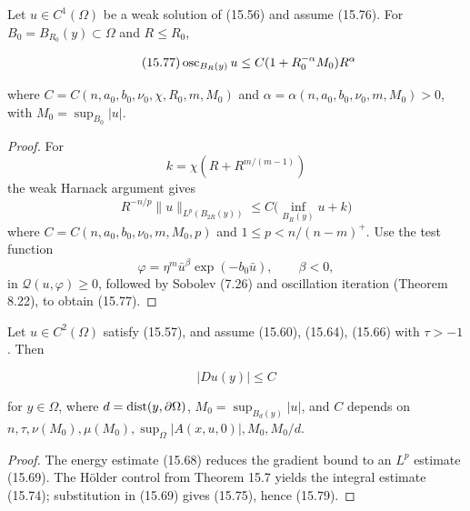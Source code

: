\begin{theorem}\label{gilbarg-trudinger.thm.15.7.weak-solution-holder}
Let $u\in C^1(\Omega)$ be a weak solution of (15.56) and assume (15.76).
For $B_0=B_{R_0}(y)\subset\Omega$ and $R\leq R_0$,

\begin{equation}
\tag{15.77}
\operatorname{osc}_{B_R(y)} u \leq C(1+R_0^{-\alpha}M_0)R^\alpha
\end{equation}

where $C=C(n,a_0,b_0,\nu_0,\chi,R_0,m,M_0)$ and
$\alpha=\alpha(n,a_0,b_0,\nu_0,m,M_0)>0$, with $M_0=\sup_{B_0}|u|$.
\end{theorem}

\begin{proof}
\sketch For
\[
k=\chi(R+R^{m/(m-1)})
\]
the weak Harnack argument gives
\begin{equation}
\tag{15.78}
R^{-n/p}\|u\|_{L^p(B_{2R}(y))}\leq C\bigl(\inf_{B_R(y)} u+k\bigr)
\end{equation}
where \(C=C(n,a_0,b_0,\nu_0,m,M_0,p)\) and \(1\le p<n/(n-m)^+\). Use
the test function
\[
\varphi=\eta^m \bar{u}^{\beta} \exp(-b_0\bar{u}), \qquad \beta<0,
\]
in \(\mathcal Q(u,\varphi)\ge0\), followed by Sobolev (7.26) and oscillation
iteration (Theorem 8.22), to obtain (15.77).
\end{proof}

\begin{theorem}\label{gilbarg-trudinger.thm.15.8.divergence-interior-gradient}
Let $u\in C^2(\Omega)$ satisfy (15.57), and assume (15.60), (15.64), (15.66)
with $\tau>-1$. Then

\begin{equation}
\tag{15.79}
|Du(y)|\leq C
\end{equation}


for $y\in\Omega$, where $d=\operatorname{dist}(y,\partial\Omega)$,
$M_0=\sup_{B_d(y)}|u|$, and $C$ depends on
$n,\tau,\nu(M_0),\mu(M_0),\sup_\Omega|A(x,u,0)|,M_0,M_0/d$.
\end{theorem}
\begin{proof}
\sketch The energy estimate (15.68) reduces the gradient bound to an $L^p$ estimate
(15.69). The H\"older control from Theorem 15.7 yields the integral estimate (15.74);
substitution in (15.69) gives (15.75), hence (15.79).
\end{proof}


